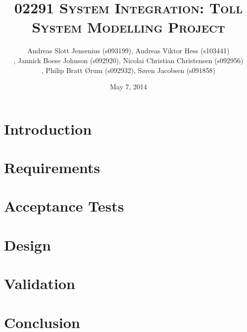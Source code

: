 \documentclass[11pt]{article}
\begin{document}
\title{\textsc{02291 System Integration: Toll System Modelling Project}}
\date{May 7, 2014}
\author{Andreas Slott Jensenius (s093199), Andreas Viktor Hess (s103441)\\,
        Jannick Boese Johnson (s092920), Nicolai Christian Christensen (s092956)\\,
        Philip Bratt Ørum (s092932), Søren Jacobsen (s091858)}
        

\maketitle

\fancyhead{}
\fancyfoot{}
\fancyfoot[C]{\thepage}

\pagestyle{fancy}


\section{Introduction}


\section{Requirements}


\section{Acceptance Tests}


\section{Design}


\section{Validation}


\section{Conclusion}

\end{document}
